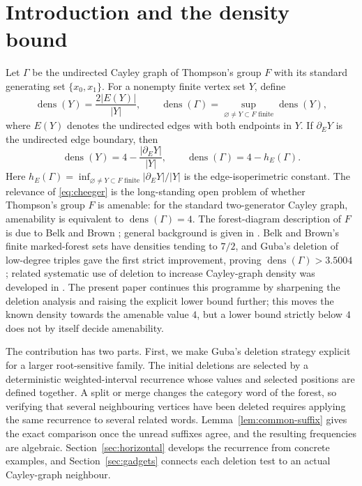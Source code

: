 \documentclass[11pt,a4paper]{article}
\theoremstyle{definition}
\theoremstyle{remark}
\newcommand{\dens}{\operatorname{dens}}
\begin{document}
\section{Introduction and the density bound}\label{sec:intro}
Let $\Gamma$ be the undirected Cayley graph of Thompson's group $F$ with its standard generating set $\{x_0,x_1\}$. For a nonempty finite vertex set $Y$, define
\[
\dens(Y)=\frac{2|E(Y)|}{|Y|},\qquad
\dens(\Gamma)=\sup_{\varnothing\ne Y\subset F\text{ finite}}\dens(Y),
\]
where $E(Y)$ denotes the undirected edges with both endpoints in $Y$. If $\partial_EY$ is the undirected edge boundary, then
\begin{equation}\label{eq:cheeger}
\dens(Y)=4-\frac{|\partial_EY|}{|Y|},\qquad
\dens(\Gamma)=4-h_E(\Gamma).
\end{equation}
Here $h_E(\Gamma)=\inf_{\varnothing\ne Y\subset F\text{ finite}}|\partial_EY|/|Y|$ is the edge-isoperimetric constant.
The relevance of \eqref{eq:cheeger} is the long-standing open problem of whether Thompson's group $F$ is amenable: for the standard two-generator Cayley graph, amenability is equivalent to $\dens(\Gamma)=4$. The forest-diagram description of $F$ is due to Belk and Brown \cite{BB}; general background is given in \cite{CFP}. Belk and Brown's finite marked-forest sets have densities tending to $7/2$, and Guba's deletion of low-degree triples gave the first strict improvement, proving $\dens(\Gamma)>3.5004$ \cite{GubaDensity}; related systematic use of deletion to increase Cayley-graph density was developed in \cite{AGLP}. The present paper continues this programme by sharpening the deletion analysis and raising the explicit lower bound further; this moves the known density towards the amenable value $4$, but a lower bound strictly below $4$ does not by itself decide amenability.

The contribution has two parts. First, we make Guba's deletion strategy explicit for a larger root-sensitive family. The initial deletions are selected by a deterministic weighted-interval recurrence whose values and selected positions are defined together. A split or merge changes the category word of the forest, so verifying that several neighbouring vertices have been deleted requires applying the same recurrence to several related words. Lemma~\ref{lem:common-suffix} gives the exact comparison once the unread suffixes agree, and the resulting frequencies are algebraic. Section~\ref{sec:horizontal} develops the recurrence from concrete examples, and Section~\ref{sec:gadgets} connects each deletion test to an actual Cayley-graph neighbour.
\end{document}
